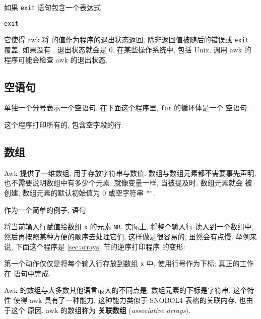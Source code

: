 如果 \verb'exit' 语句包含一个表达式
\begin{pattern}
    \verb'exit' \expr
\end{pattern}
它使得 awk 将 \expr 的值作为程序的退出状态返回, 除非返回值被随后的错误或
\verb'exit' 覆盖. 如果没有 \expr, 退出状态就会是 0. 在某些操作系统中, 包括
Unix, 调用 awk 的程序可能会检查  awk 的退出状态.

\subsection{空语句}
\label{subsec:empty_statement}

单独一个分号表示一个空语句. 在下面这个程序里, \verb'for' 的循环体是一个
空语句.
这个程序打印所有的, 包含空字段的行.

\subsection{数组}
\label{subsec:arrays}

Awk 提供了一维数组, 用于存放字符串与数值. 数组与数组元素都不需要事先声明,
也不需要说明数组中有多少个元素. 就像变量一样, 当被提及时, 数组元素就会
被创建, 数组元素的默认初始值为 0 或空字符串
\verb'""'.

作为一个简单的例子, 语句
将当前输入行赋值给数组 \verb'x' 的元素 \verb'NR'. 实际上, 将整个输入行
读入到一个数组中, 然后再按照某种方便的顺序去处理它们, 这样做是很容易的,
虽然会有点慢. 举例来说, 下面这个程序是 \ref{sec:arrays} 节的逆序打印程序
的变形:
第一个动作仅仅是将每个输入行存放到数组 \verb'x' 中, 使用行号作为下标;
真正的工作在 \END 语句中完成.

Awk 的数组与大多数其他语言最大的不同点是, 数组元素的下标是字符串. 这个特性
使得 awk 具有了一种能力, 这种能力类似于 SNOBOL4 表格的关联内存, 也由于这个
原因, awk 的数组称为 \textbf{关联数组} (\emph{associative arrays}).

